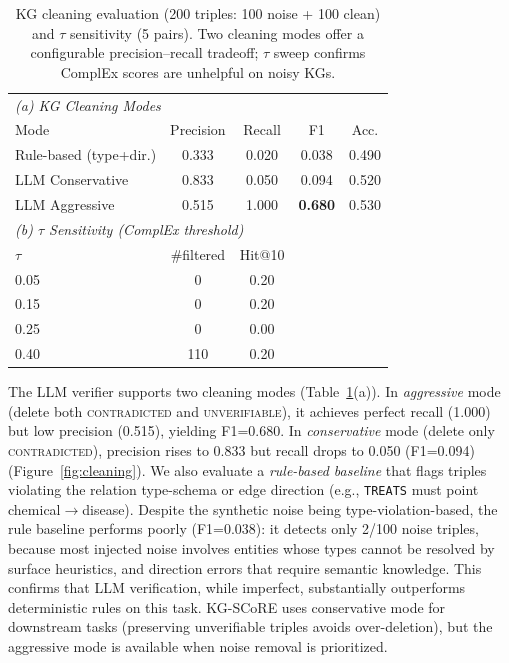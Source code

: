 \begin{table}[tb]
  \centering
  \caption{KG cleaning evaluation (200 triples: 100 noise + 100 clean) and $\tau$ sensitivity (5 pairs). Two cleaning modes offer a configurable precision--recall tradeoff; $\tau$ sweep confirms ComplEx scores are unhelpful on noisy KGs.}
  \label{tab:cleaning_tau}
  \small
  \begin{tabular}{lcccc}
    \toprule
    \multicolumn{5}{l}{\textit{(a) KG Cleaning Modes}} \\
    Mode & Precision & Recall & F1 & Acc. \\
    \midrule
    Rule-based (type+dir.) & 0.333 & 0.020 & 0.038 & 0.490 \\
    LLM Conservative & 0.833 & 0.050 & 0.094 & 0.520 \\
    LLM Aggressive & 0.515 & 1.000 & \textbf{0.680} & 0.530 \\
    \midrule
    \multicolumn{5}{l}{\textit{(b) $\tau$ Sensitivity (ComplEx threshold)}} \\
    $\tau$ & \#filtered & Hit@10 & & \\
    \midrule
    0.05 & 0 & 0.20 & & \\
    0.15 & 0 & 0.20 & & \\
    0.25 & 0 & 0.00 & & \\
    0.40 & 110 & 0.20 & & \\
    \bottomrule
  \end{tabular}
\end{table}

The LLM verifier supports two cleaning modes (Table~\ref{tab:cleaning_tau}(a)). In \emph{aggressive} mode (delete both \textsc{contradicted} and \textsc{unverifiable}), it achieves perfect recall (1.000) but low precision (0.515), yielding F1=0.680. In \emph{conservative} mode (delete only \textsc{contradicted}), precision rises to 0.833 but recall drops to 0.050 (F1=0.094) (Figure~\ref{fig:cleaning}). We also evaluate a \emph{rule-based baseline} that flags triples violating the relation type-schema or edge direction (e.g., \texttt{TREATS} must point chemical$\to$disease). Despite the synthetic noise being type-violation-based, the rule baseline performs poorly (F1=0.038): it detects only 2/100 noise triples, because most injected noise involves entities whose types cannot be resolved by surface heuristics, and direction errors that require semantic knowledge. This confirms that LLM verification, while imperfect, substantially outperforms deterministic rules on this task. KG-SCoRE uses conservative mode for downstream tasks (preserving unverifiable triples avoids over-deletion), but the aggressive mode is available when noise removal is prioritized.

